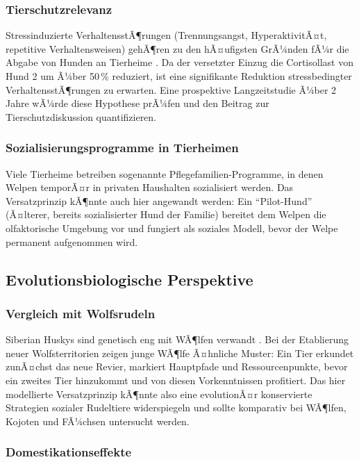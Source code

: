 ﻿\documentclass[12pt, a4paper]{article}
\theoremstyle{plain}
\theoremstyle{definition}
\theoremstyle{remark}
\begin{document}
\subsubsection{Tierschutzrelevanz}

Stressinduzierte VerhaltensstÃ¶rungen (Trennungsangst, HyperaktivitÃ¤t,
repetitive Verhaltensweisen) gehÃ¶ren zu den hÃ¤ufigsten GrÃ¼nden fÃ¼r die
Abgabe von Hunden an Tierheime \cite{reisner1994usefulness}. Da der
versetzter Einzug die Cortisollast von Hund 2 um Ã¼ber 50\,\% reduziert,
ist eine signifikante Reduktion stressbedingter VerhaltensstÃ¶rungen zu
erwarten. Eine prospektive Langzeitstudie Ã¼ber 2 Jahre wÃ¼rde diese Hypothese
prÃ¼fen und den Beitrag zur Tierschutzdiskussion quantifizieren.

\subsubsection{Sozialisierungsprogramme in Tierheimen}

Viele Tierheime betreiben sogenannte Pflegefamilien-Programme, in denen
Welpen temporÃ¤r in privaten Haushalten sozialisiert werden. Das
Versatzprinzip kÃ¶nnte auch hier angewandt werden: Ein ``Pilot-Hund'' (Ã¤lterer,
bereits sozialisierter Hund der Familie) bereitet dem Welpen die olfaktorische
Umgebung vor und fungiert als soziales Modell, bevor der Welpe permanent
aufgenommen wird.

\subsection{Evolutionsbiologische Perspektive}

\subsubsection{Vergleich mit Wolfsrudeln}

Siberian Huskys sind genetisch eng mit WÃ¶lfen verwandt \cite{vonholdt2010genome}.
Bei der Etablierung neuer Wolfsterritorien zeigen junge WÃ¶lfe Ã¤hnliche
Muster: Ein Tier erkundet zunÃ¤chst das neue Revier, markiert Hauptpfade und
Ressourcenpunkte, bevor ein zweites Tier hinzukommt und von diesen
Vorkenntnissen profitiert. Das hier modellierte Versatzprinzip kÃ¶nnte also
eine evolutionÃ¤r konservierte Strategien sozialer Rudeltiere widerspiegeln
und sollte komparativ bei WÃ¶lfen, Kojoten und FÃ¼chsen untersucht werden.

\subsubsection{Domestikationseffekte}
\end{document}
